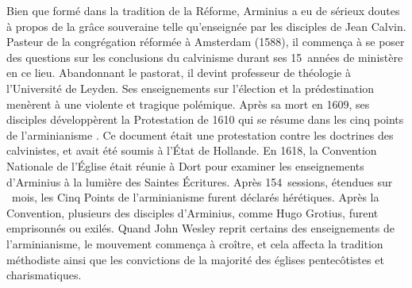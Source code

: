 \begin{specialpar}{}
Bien que formé dans la tradition de la Réforme, Arminius a eu de sérieux doutes
 à propos de \og la grâce souveraine \fg{}  telle qu'enseignée
 par les disciples de Jean Calvin. Pasteur de la congrégation réformée à Amsterdam (1588),
 il commença à se poser des questions sur les conclusions du calvinisme
 durant ses 15~années de ministère en ce lieu. Abandonnant le pastorat,
 il devint professeur de théologie à l'Université de Leyden.
 Ses enseignements sur l'élection et la prédestination menèrent à une violente
 et tragique polémique. Après sa mort en 1609, ses disciples développèrent la Protestation
 de 1610 qui se résume dans les \og cinq points de l'arminianisme \fg{}.
 Ce document était une protestation contre les doctrines des calvinistes,
 et avait été soumis à l'État de Hollande. En 1618, la Con\-vention Nationale
 de l'Église était réunie à Dort pour examiner les enseignements d'Arminius
 à la lumière des Saintes Écritures. Après 154~sessions, étendues sur ~mois,
 les Cinq Points de l'arminianisme furent déclarés hérétiques.
 Après la Con\-ven\-tion, plusieurs des disciples d'Armi\-nius, comme Hugo Grotius,
 furent emprisonnés ou exilés. Quand John Wesley reprit certains des enseignements
 de l'armi\-nia\-nisme, le mouvement  commença à croître, et cela affecta la tradition méthodiste
 ainsi que les convictions de la majorité des églises pentecôtistes et charismatiques.
\end{specialpar}


\closeintro

